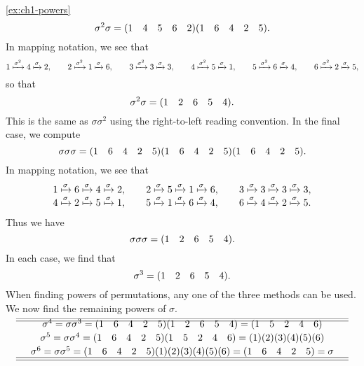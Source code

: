 \begin{solution}{\ref{ex:ch1-powers}}
{    \[
    \sigma^{2}\sigma = (1 \quad 4 \quad 5 \quad 6 \quad 2)(1 \quad 6 \quad 4 \quad 2 \quad 5).
    \]
    In mapping notation, we see that
    \[
    1 \xmapsto{\sigma^{2}} 4 \xmapsto{\sigma} 2, \hspace{20pt} 2 \xmapsto{\sigma^{2}} 1 \xmapsto{\sigma} 6, \hspace{20pt} 3 \xmapsto{\sigma^{2}} 3 \xmapsto{\sigma} 3, \hspace{20pt} 4 \xmapsto{\sigma^{2}} 5 \xmapsto{\sigma} 1, \hspace{20pt} 5 \xmapsto{\sigma^{2}} 6 \xmapsto{\sigma} 4, \hspace{20pt} 6 \xmapsto{\sigma^{2}} 2 \xmapsto{\sigma} 5,
    \]
    so that
    \[
    \sigma^{2}\sigma = (1 \quad 2 \quad 6 \quad 5 \quad 4).
    \]
    This is the same as \(\sigma\sigma^{2}\) using the right-to-left reading convention. In the final case, we compute
    \[
    \sigma\sigma\sigma = (1 \quad 6 \quad 4 \quad 2 \quad 5)(1 \quad 6 \quad 4 \quad 2 \quad 5)(1 \quad 6 \quad 4 \quad 2 \quad 5).
    \]
    In mapping notation, we see that
    \[
    \begin{array}{c}
        1 \xmapsto{\sigma} 6 \xmapsto{\sigma} 4 \xmapsto{\sigma} 2, \hspace{20pt} 2 \xmapsto{\sigma} 5 \xmapsto{\sigma} 1 \xmapsto{\sigma} 6, \hspace{20pt} 3 \xmapsto{\sigma} 3 \xmapsto{\sigma} 3 \xmapsto{\sigma} 3,\\
        4 \xmapsto{\sigma} 2 \xmapsto{\sigma} 5 \xmapsto{\sigma} 1, \hspace{20pt} 5 \xmapsto{\sigma} 1 \xmapsto{\sigma} 6 \xmapsto{\sigma} 4, \hspace{20pt} 6 \xmapsto{\sigma} 4 \xmapsto{\sigma} 2 \xmapsto{\sigma} 5.
    \end{array}
    \]
    Thus we have
    \[
    \sigma\sigma\sigma = (1 \quad 2 \quad 6 \quad 5 \quad 4).
    \]
    In each case, we find that
    \[
    \sigma^{3} = (1 \quad 2 \quad 6 \quad 5 \quad 4).
    \]
    When finding powers of permutations, any one of the three methods can be used. We now find the remaining powers of \(\sigma\).
    \[
    \begin{array}{c}\hline\\[-15pt]\hline\\[-12pt]
        \quad\sigma^{4} = \sigma\sigma^{3} = (1 \quad 6 \quad 4 \quad 2 \quad 5)(1 \quad 2 \quad 6 \quad 5 \quad 4) = (1 \quad 5 \quad 2 \quad 4 \quad 6)\quad \\[2pt]
        \quad\sigma^{5} = \sigma\sigma^{4} = (1 \quad 6 \quad 4 \quad 2 \quad 5)(1 \quad 5 \quad 2 \quad 4 \quad 6) = (1)(2)(3)(4)(5)(6)\quad \\[2pt]
        \quad\sigma^{6} = \sigma\sigma^{5} = (1 \quad 6 \quad 4 \quad 2 \quad 5)(1)(2)(3)(4)(5)(6) = (1 \quad 6 \quad 4 \quad 2 \quad 5) = \sigma\quad \\[2pt]\hline\\[-15pt]\hline

\end{array}\]}
\end{solution}
